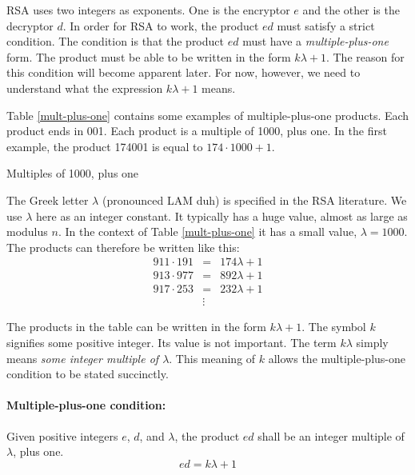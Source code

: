 
RSA uses two integers as exponents.
One is the encryptor $e$ and the other is the decryptor $d$.
In order for RSA to work, the product $ed$ must satisfy a strict condition.
The condition is that the product $ed$ must have a \emph{multiple-plus-one} form.
The product must be able to be written in the form $k\lambda+1$.
The reason for this condition will become apparent later.
For now, however, we need to understand what the expression $k\lambda+1$ means.

Table \ref{mult-plus-one} contains some examples of multiple-plus-one products.
Each product ends in 001.
Each product is a multiple of 1000, plus one.
In the first example, the product 174001 is equal to $174 \cdot 1000 + 1$.

\vspace{2ex}
\begin{table}[!ht]
  \begin{small}
    
  \end{small}
  \caption{Multiples of 1000, plus one}
  \label{mult-plus-one}
\end{table}
\vspace{2ex}

The Greek letter $\lambda$ (pronounced \textsf{LAM duh})
is specified in the RSA literature.\cite{RSA-standard}
We use $\lambda$ here as an integer constant.
It typically has a huge value, almost as large as modulus $n$.
In the context of Table \ref{mult-plus-one} it has a small value, $\lambda=1000$.
The products can therefore be written like this:
\begin{eqnarray*}
  911 \cdot 191  &=&  174 \lambda + 1 \\
  913 \cdot 977  &=&  892 \lambda + 1 \\
  917 \cdot 253  &=&  232 \lambda + 1 \\
  & \vdots &
\end{eqnarray*}

The products in the table can be written in the form $k\lambda+1$.
The symbol $k$ signifies some positive integer.
Its value is not important.
The term $k\lambda$ simply means \emph{some integer multiple of $\lambda$}.
This meaning of $k$ allows the multiple-plus-one condition to be stated succinctly.

\paragraph{Multiple-plus-one condition:}
Given positive integers $e$, $d$, and $\lambda$,
the product $ed$ shall be an integer multiple of $\lambda$, plus one.
\begin{equation} \label{eq:inv-pair}
  ed = k\lambda + 1
\end{equation}

